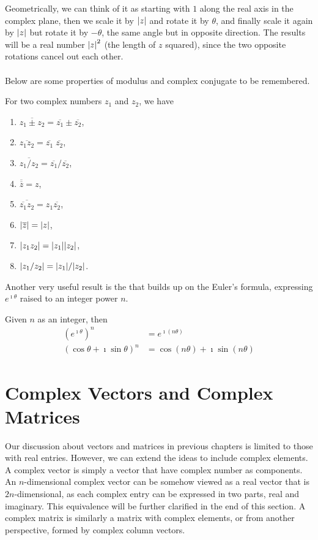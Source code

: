 Geometrically, we can think of it as starting with $1$ along the real axis in the complex plane, then we scale it by $\abs{z}$ and rotate it by $\theta$, and finally scale it again by $\abs{z}$ but rotate it by $-\theta$, the same angle but in opposite direction. The results will be a real number $\abs{z}^2$ (the length of $z$ squared), since the two opposite rotations cancel out each other.\\
\\
Below are some properties of modulus and complex conjugate to be remembered.
\begin{proper}
\label{proper:complexnum}
For two complex numbers $z_1$ and $z_2$, we have
\begin{enumerate}[label=(\alph*)]
\item $\overline{z_1 \pm z_2} = \overline{z_1} \pm \overline{z_2}$, 
\item $\overline{z_1z_2} = \overline{z_1}\;\overline{z_2}$,
\item $\overline{z_1/z_2} = \overline{z_1}/\overline{z_2}$,
\item $\overline{\overline{z}} = z$,
\item $\overline{\overline{z_1}z_2} = z_1\overline{z_2}$,
\item $\abs{\overline{z}} = \abs{z}$,
\item $\abs{z_1z_2} = \abs{z_1}\abs{z_2}$,
\item $\abs{z_1/z_2} = \abs{z_1}/\abs{z_2}$.
\end{enumerate}
\end{proper}
Another very useful result is the  that builds up on the Euler's formula, expressing $e^{\imath \theta}$ raised to an integer power $n$.
\begin{thm}
Given $n$ as an integer, then
\begin{align*}
(e^{\imath \theta})^n &= e^{\imath (n\theta)} \\
(\cos\theta + \imath \sin\theta)^n &= \cos(n\theta) + \imath \sin(n\theta)
\end{align*}
\end{thm}

\section{Complex Vectors and Complex Matrices}

Our discussion about vectors and matrices in previous chapters is limited to those with real entries. However, we can extend the ideas to include complex elements. A complex vector is simply a vector that have complex number as components. An $n$-dimensional complex vector can be somehow viewed as a real vector that is $2n$-dimensional, as each complex entry can be expressed in two parts, real and imaginary. This equivalence will be further clarified in the end of this section. A complex matrix is similarly a matrix with complex elements, or from another perspective, formed by complex column vectors.

